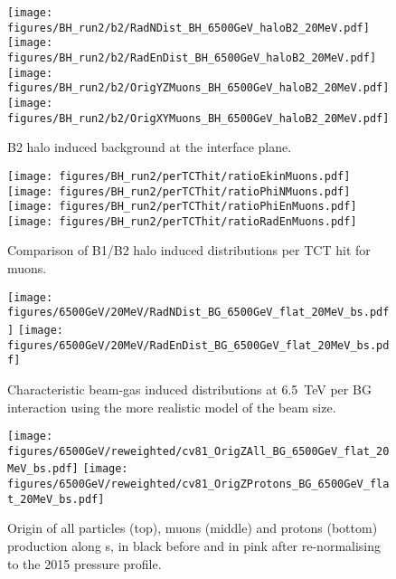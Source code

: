 \begin{figure}%
\centering
\texttt{[image: figures/BH\_run2/b2/RadNDist\_BH\_6500GeV\_haloB2\_20MeV.pdf]}
\texttt{[image: figures/BH\_run2/b2/RadEnDist\_BH\_6500GeV\_haloB2\_20MeV.pdf]}
\texttt{[image: figures/BH\_run2/b2/OrigYZMuons\_BH\_6500GeV\_haloB2\_20MeV.pdf]}
\texttt{[image: figures/BH\_run2/b2/OrigXYMuons\_BH\_6500GeV\_haloB2\_20MeV.pdf]}
 \caption{B2 halo induced background at the interface plane. 
  \label{dist6500GeVB22}}
\end{figure}

\begin{figure}%
\begin{center}
  \texttt{[image: figures/BH\_run2/perTCThit/ratioEkinMuons.pdf]}
  \texttt{[image: figures/BH\_run2/perTCThit/ratioPhiNMuons.pdf]}
  \texttt{[image: figures/BH\_run2/perTCThit/ratioPhiEnMuons.pdf]}
  \texttt{[image: figures/BH\_run2/perTCThit/ratioRadEnMuons.pdf]}
\end{center}
\vspace{-0.6cm}
 \caption{Comparison of B1/B2 halo induced distributions per TCT hit for muons.
  \label{compBHB1B2run2}}
\end{figure}

\newpage

\begin{figure}%
\begin{center}
  \texttt{[image: figures/6500GeV/20MeV/RadNDist\_BG\_6500GeV\_flat\_20MeV\_bs.pdf]}
  \texttt{[image: figures/6500GeV/20MeV/RadEnDist\_BG\_6500GeV\_flat\_20MeV\_bs.pdf]}
\end{center}
\vspace{-0.6cm}
 \caption{Characteristic beam-gas induced distributions at 6.5~TeV per BG interaction using the more realistic model of the beam size.
  \label{bg65002}}
\end{figure}

\begin{figure}
\begin{center}
  \texttt{[image: figures/6500GeV/reweighted/cv81\_OrigZAll\_BG\_6500GeV\_flat\_20MeV\_bs.pdf]}
  \texttt{[image: figures/6500GeV/reweighted/cv81\_OrigZProtons\_BG\_6500GeV\_flat\_20MeV\_bs.pdf]}
\end{center}
\vspace{-0.6cm}
 \caption{Origin of all particles (top), muons (middle) and protons (bottom) production along s, in black before and in pink after re-normalising to the 2015 pressure profile. 
  \label{fig:OrigZ6p52}}
\end{figure}


